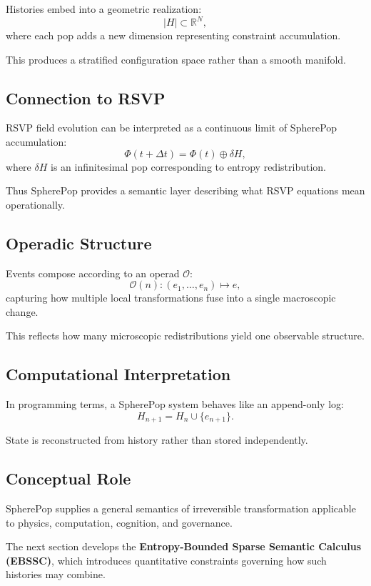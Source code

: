 \documentclass[12pt]{article}
\begin{document}
Histories embed into a geometric realization:
\[
|H| \subset \mathbb{R}^N,
\]
where each pop adds a new dimension representing constraint accumulation.

This produces a stratified configuration space rather than a smooth manifold.

\subsection{Connection to RSVP}

RSVP field evolution can be interpreted as a continuous limit of SpherePop accumulation:
\[
\Phi(t+\Delta t)=\Phi(t)\oplus \delta H,
\]
where $\delta H$ is an infinitesimal pop corresponding to entropy redistribution.

Thus SpherePop provides a semantic layer describing what RSVP equations mean operationally.

\subsection{Operadic Structure}

Events compose according to an operad $\mathcal{O}$:
\[
\mathcal{O}(n) : (e_1,\dots,e_n)\mapsto e,
\]
capturing how multiple local transformations fuse into a single macroscopic change.

This reflects how many microscopic redistributions yield one observable structure.

\subsection{Computational Interpretation}

In programming terms, a SpherePop system behaves like an append-only log:
\[
H_{n+1}=H_n \cup \{e_{n+1}\}.
\]

State is reconstructed from history rather than stored independently.

\subsection{Conceptual Role}

SpherePop supplies a general semantics of irreversible transformation applicable to physics, computation, cognition, and governance.

\bigskip

The next section develops the \textbf{Entropy-Bounded Sparse Semantic Calculus (EBSSC)}, which introduces quantitative constraints governing how such histories may combine.
\end{document}

